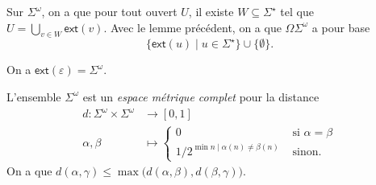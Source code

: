 \documentclass[./main]{subfiles}
\begin{document}
  \begin{rmk}
    Sur $\Sigma^\omega$, on a que pour tout ouvert $U$, il existe $W \subseteq \Sigma^\star$ tel que $U = \bigcup_{v \in W} \mathsf{ext}(v)$.
    Avec le lemme précédent, on a que $\Omega\Sigma^\omega$ a pour base 
    \[
    \{\mathsf{ext}(u)  \mid u \in \Sigma^\star\}  \cup \{\emptyset\} 
    .\]
  \end{rmk}

  \begin{rmk}
    On a $\mathsf{ext}(\varepsilon) = \Sigma^\omega$.
  \end{rmk}

  \begin{rmk}
    L'ensemble $\Sigma^\omega$ est un \textit{espace métrique complet} pour la distance 
    \begin{align*}
      d: \Sigma^\omega \times \Sigma^\omega &\longrightarrow [0,1] \\
      \alpha, \beta &\longmapsto \begin{cases}
        0 & \text{ si } \alpha = \beta\\
        1 / {2^{\min n  \mid \alpha(n) \neq \beta(n)}} & \text{ sinon}.
      \end{cases}
    \end{align*}
    On a que $d(\alpha, \gamma) \le \max\big(d(\alpha, \beta), d(\beta, \gamma)\big)$.
  \end{rmk}
\end{document}
